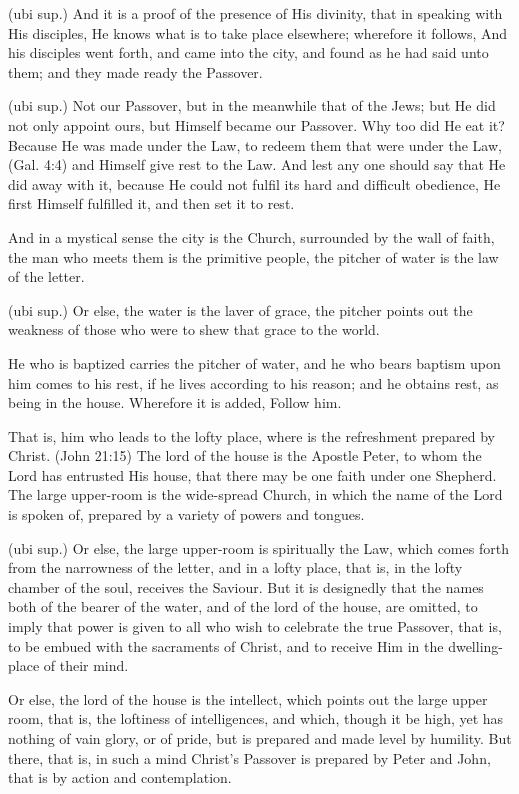  (ubi sup.) And it is a proof of the presence of His divinity, that in speaking with His disciples, He knows what is to take place elsewhere; wherefore it follows, And his disciples went forth, and came into the city, and found as he had said unto them; and they made ready the Passover.

 (ubi sup.) Not our Passover, but in the meanwhile that of the Jews; but He did not only appoint ours, but Himself became our Passover. Why too did He eat it? Because He was made under the Law, to redeem them that were under the Law, (Gal. 4:4) and Himself give rest to the Law. And lest any one should say that He did away with it, because He could not fulfil its hard and difficult obedience, He first Himself fulfilled it, and then set it to rest.

 And in a mystical sense the city is the Church, surrounded by the wall of faith, the man who meets them is the primitive people, the pitcher of water is the law of the letter.

 (ubi sup.) Or else, the water is the laver of grace, the pitcher points out the weakness of those who were to shew that grace to the world.

 He who is baptized carries the pitcher of water, and he who bears baptism upon him comes to his rest, if he lives according to his reason; and he obtains rest, as being in the house. Wherefore it is added, Follow him.

 That is, him who leads to the lofty place, where is the refreshment prepared by Christ. (John 21:15) The lord of the house is the Apostle Peter, to whom the Lord has entrusted His house, that there may be one faith under one Shepherd. The large upper-room is the wide-spread Church, in which the name of the Lord is spoken of, prepared by a variety of powers and tongues.

 (ubi sup.) Or else, the large upper-room is spiritually the Law, which comes forth from the narrowness of the letter, and in a lofty place, that is, in the lofty chamber of the soul, receives the Saviour. But it is designedly that the names both of the bearer of the water, and of the lord of the house, are omitted, to imply that power is given to all who wish to celebrate the true Passover, that is, to be embued with the sacraments of Christ, and to receive Him in the dwelling-place of their mind.

 Or else, the lord of the house is the intellect, which points out the large upper room, that is, the loftiness of intelligences, and which, though it be high, yet has nothing of vain glory, or of pride, but is prepared and made level by humility. But there, that is, in such a mind Christ’s Passover is prepared by Peter and John, that is by action and contemplation.

